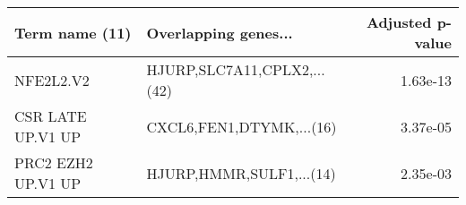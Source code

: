 \begin{tabular}{llr}
\toprule
    Term name (11) &        Overlapping genes... &  Adjusted p-value \\
\midrule
         NFE2L2.V2 & HJURP,SLC7A11,CPLX2,...(42) &          1.63e-13 \\
 CSR LATE UP.V1 UP &    CXCL6,FEN1,DTYMK,...(16) &          3.37e-05 \\
PRC2 EZH2 UP.V1 UP &    HJURP,HMMR,SULF1,...(14) &          2.35e-03 \\
\bottomrule
\end{tabular}
